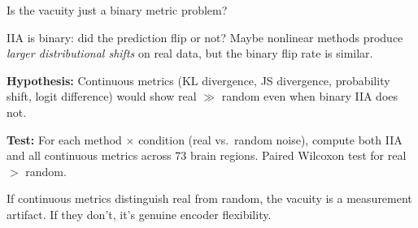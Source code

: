 \documentclass[aspectratio=169,11pt]{beamer}
\begin{document}
\begin{frame}{Is the vacuity just a binary metric problem?}

IIA is binary: did the prediction flip or not? Maybe nonlinear methods produce \emph{larger distributional shifts} on real data, but the binary flip rate is similar.

\vspace{0.5em}

\textbf{Hypothesis:} Continuous metrics (KL divergence, JS divergence, probability shift, logit difference) would show real $\gg$ random even when binary IIA does not.

\vspace{0.5em}

\textbf{Test:} For each method $\times$ condition (real vs.\ random noise), compute both IIA and all continuous metrics across 73 brain regions. Paired Wilcoxon test for real $>$ random.

\vspace{0.8em}

{\small If continuous metrics distinguish real from random, the vacuity is a measurement artifact. If they don't, it's genuine encoder flexibility.}
\end{frame}
\end{document}
